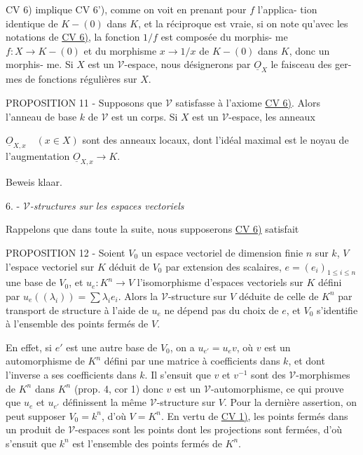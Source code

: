 CV 6) implique CV 6'), comme on voit en prenant pour $f$ l'applica-
tion identique de $K-(0)$ dans $K$, et la réciproque est vraie, si on note
qu'avec les notations de \underline{CV 6)}, la fonction $1/f$ est composée du morphis-
me $f: X \to K-(0)$ et du morphisme $x \to 1/x$ de $K-(0)$ dans $K$, donc un morphis-
me. Si $X$ est un $\mathcal{V}$-espace, nous désignerons par $\underline{O}_X$ le faisceau des ger-
mes de fonctions régulières sur $X$.

PROPOSITION 11 - Supposons que $\mathcal{V}$ satisfasse à l'axiome \underline{CV 6)}. Alors
l'anneau de base $k$ de $\mathcal{V}$ est un corps. Si $X$ est un $\mathcal{V}$-espace, les anneaux

\newpage



$\underline{O}_{X,x} \quad (x\in X)$ sont des anneaux locaux, dont l'idéal maximal est le noyau de l'augmentation $\underline{O}_{X,x} \to K$.

Beweis klaar.

6. - \emph{$\mathcal{V}$-structures sur les espaces vectoriels}

Rappelons que dans toute la suite, nous supposerons \underline{CV 6)} satisfait

PROPOSITION 12 - Soient $V_0$ un espace vectoriel de dimension finie $n$ sur $k$, $V$ l'espace vectoriel sur $K$ déduit de $V_0$ par extension des scalaires, $e = (e_i)_{1 \le i \le n}$ une base de $V_0$, et $u_e : K^n \to V$ l'isomorphisme d'espaces vectoriels sur $K$ défini par $u_e((\lambda_i)) = \sum \lambda_i e_i$. Alors la $\mathcal{V}$-structure sur $V$ déduite de celle de $K^n$ par transport de structure à l'aide de $u_e$ ne dépend pas du choix de $e$, et $V_0$ s'identifie à l'ensemble des points fermés de $V$.

En effet, si $e'$ est une autre base de $V_0$, on a $u_{e'} = u_e v$, où $v$ est un automorphisme de $K^n$ défini par une matrice à coefficients dans $k$, et dont l'inverse a ses coefficients dans $k$. Il s'ensuit que $v$ et $v^{-1}$ sont des $\mathcal{V}$-morphismes de $K^n$ dans $K^n$ (prop. 4, cor 1) donc $v$ est un $\mathcal{V}$-automorphisme, ce qui prouve que $u_e$ et $u_{e'}$ définissent la même $\mathcal{V}$-structure sur $V$. Pour la dernière assertion, on peut supposer $V_0 = k^n$, d'où $V=K^n$. En vertu de \underline{CV 1)}, les points fermés dans un produit de $\mathcal{V}$-espaces sont les points dont les projections sont fermées, d'où s'ensuit que $k^n$ est l'ensemble des points fermés de $K^n$.

